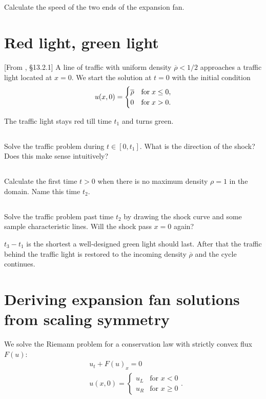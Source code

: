 \documentclass[11pt,letterpaper]{report}
\begin{document}
\subsection{}
Calculate the speed of the two ends of the expansion fan.

\section{Red light, green light}
[From \cite{ShearerLevy_15}, \S 13.2.1] A line of traffic with uniform density $\overline{\rho}<1/2$ approaches a traffic light located at $x=0$. We start the solution at $t=0$ with the initial condition
\begin{align}
    u(x,0) = \begin{cases}
        \overline{\rho} & \text{for\;} x\leq 0,\\
        0 & \text{for\;} x>0.
    \end{cases}
\end{align}

The traffic light stays red till time $t_1$ and turns green. 

\subsection{}
Solve the traffic problem during $t\in[0,t_1]$. What is the direction of the shock? Does this make sense intuitively?

\subsection{}
Calculate the first time $t>0$ when there is no maximum density $\rho=1$ in the domain. Name this time $t_2$.

\subsection{}
Solve the traffic problem past time $t_2$ by drawing the shock curve and some sample characteristic lines. Will the shock pass $x=0$ again? 

$t_3-t_1$ is the shortest a well-designed green light should last. After that the traffic behind the traffic light is restored to the incoming density $\overline{\rho}$ and the cycle continues.

\section{Deriving expansion fan solutions from scaling symmetry}
We solve the Riemann problem for a conservation law with strictly convex flux $F(u)$:
\begin{align}
    & u_t+F(u)_x = 0\\
    & u(x,0) = \begin{cases}
        u_L &\text{for }x<0\\
        u_R &\text{for }x\geq 0
    \end{cases}.
\end{align}
\end{document}
